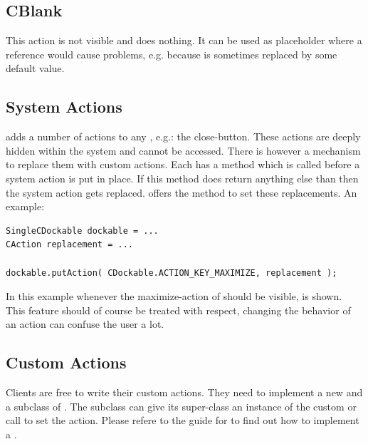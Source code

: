 \subsection{CBlank}
This action is not visible and does nothing. It can be used as placeholder where a  reference would cause problems, e.g. because  is sometimes replaced by some default value.

\subsection{System Actions}
 adds a number of actions to any , e.g.: the close-button. These actions are deeply hidden within the system and cannot be accessed. There is however a mechanism to replace them with custom actions. Each  has a method  which is called before a system action is put in place. If this method does return anything else than  then the system action gets replaced.  offers the method  to set these replacements. An example:
\begin{lstlisting}
SingleCDockable dockable = ...
CAction replacement = ...

dockable.putAction( CDockable.ACTION_KEY_MAXIMIZE, replacement );
\end{lstlisting}
In this example whenever the maximize-action of  should be visible,  is shown. This feature should of course be treated with respect, changing the behavior of an action can confuse the user a lot.


\subsection{Custom Actions}
Clients are free to write their custom actions. They need to implement a new  and a subclass of . The subclass can give its super-class an instance of the custom  or call  to set the action. Please refere to the guide for  to find out how to implement a .
 
